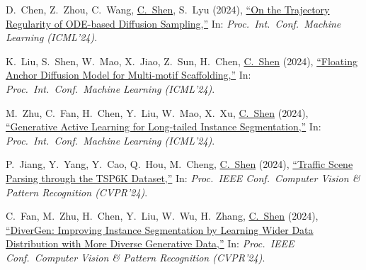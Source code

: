 \documentclass[9pt, a4paper]{article}
\newcommand{\years}[1]{\marginnote{\scriptsize #1}}
\def\highlight{\uline}
\begin{document}
\medskip

\years{2024} D.~Chen, Z.~Zhou, C.~Wang, \highlight{C.~Shen}, S.~Lyu (2024),
\href{http://www.google.com/search?lr=&ie=UTF-8&oe=UTF-8&q=On+the+Trajectory+Regularity+of+ODE-based+Diffusion+Sampling+Defang+Chen%2C+Zhenyu+Zhou%2C+Can+Wang%2C+Chunhua+Shen%2C+Siwei+Lyu}{``On the Trajectory Regularity of {ODE}-based Diffusion Sampling,{}''}
In: \emph{Proc.\ Int.\ Conf.\  Machine Learning (ICML'24)}.

\medskip

\years{2024} K.~Liu, S.~Shen, W.~Mao, X.~Jiao, Z.~Sun, H.~Chen, \highlight{C.~Shen} (2024),
\href{http://www.google.com/search?lr=&ie=UTF-8&oe=UTF-8&q=Floating+Anchor+Diffusion+Model+for+Multi-motif+Scaffolding+Ke+Liu%2C+Shuaike+Shen%2C+Weian+Mao%2C+Xiaoran+Jiao%2C+Zheng+Sun%2C+Hao+Chen%2C+Chunhua+Shen}{``Floating Anchor Diffusion Model for Multi-motif Scaffolding,{}''}
In: \emph{Proc.\ Int.\ Conf.\  Machine Learning (ICML'24)}.

\medskip

\years{2024} M.~Zhu, C.~Fan, H.~Chen, Y.~Liu, W.~Mao, X.~Xu, \highlight{C.~Shen} (2024),
\href{http://www.google.com/search?lr=&ie=UTF-8&oe=UTF-8&q=Generative+Active+Learning+for+Long-tailed+Instance+Segmentation+Muzhi+Zhu%2C+Chengxiang+Fan%2C+Hao+Chen%2C+Yang+Liu%2C+Weian+Mao%2C+Xiaogang+Xu%2C+Chunhua+Shen}{``Generative Active Learning for Long-tailed Instance Segmentation,{}''}
In: \emph{Proc.\ Int.\ Conf.\  Machine Learning (ICML'24)}.

\medskip

\years{2024} P.~Jiang, Y.~Yang, Y.~Cao, Q.~Hou, M.~Cheng, \highlight{C.~Shen} (2024),
\href{http://www.google.com/search?lr=&ie=UTF-8&oe=UTF-8&q=Traffic+Scene+Parsing+through+the+TSP6K+Dataset+Peng-Tao+Jiang%2C+Yuqi+Yang%2C+Yang+Cao%2C+Qibin+Hou%2C+Ming-Ming+Cheng%2C+Chunhua+Shen}{``Traffic Scene Parsing through the TSP6K Dataset,{}''}
In: \emph{Proc.\ IEEE Conf.\  Computer Vision \& Pattern Recognition (CVPR'24)}.

\medskip

\years{2024} C.~Fan, M.~Zhu, H.~Chen, Y.~Liu, W.~Wu, H.~Zhang, \highlight{C.~Shen} (2024),
\href{http://www.google.com/search?lr=&ie=UTF-8&oe=UTF-8&q=DiverGen%3A+Improving+Instance+Segmentation+by+Learning+Wider+Data+Distribution+with+More+Diverse+Generative+Data+Chengxiang+Fan%2C+Muzhi+Zhu%2C+Hao+Chen%2C+Yang+Liu%2C+Weijia+Wu%2C+Huaqi+Zhang%2C+Chunhua+Shen}{``{DiverGen}: Improving Instance Segmentation by Learning Wider Data Distribution with More Diverse Generative Data,{}''}
In: \emph{Proc.\ IEEE Conf.\  Computer Vision \& Pattern Recognition (CVPR'24)}.
\end{document}
